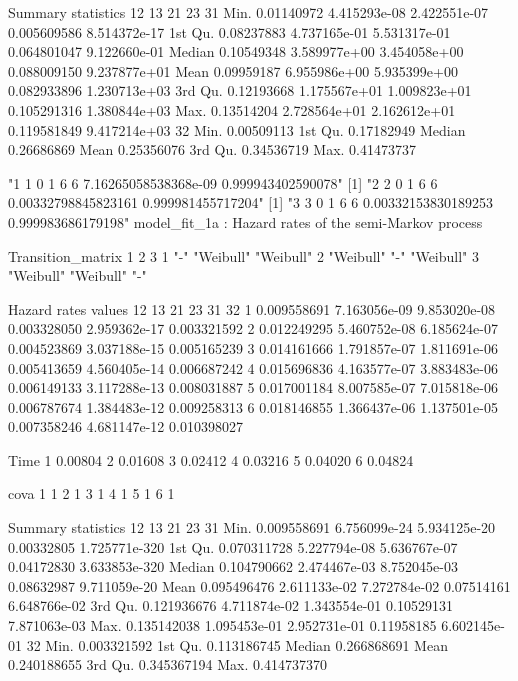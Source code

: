 \documentclass[11pt,a4paper]{article}
\begin{document}
\begin{enumerate}
\begin{Schunk}
\begin{Soutput}
Summary statistics
                12           13           21          23           31
Min.    0.01140972 4.415293e-08 2.422551e-07 0.005609586 8.514372e-17
1st Qu. 0.08237883 4.737165e-01 5.531317e-01 0.064801047 9.122660e-01
Median  0.10549348 3.589977e+00 3.454058e+00 0.088009150 9.237877e+01
Mean    0.09959187 6.955986e+00 5.935399e+00 0.082933896 1.230713e+03
3rd Qu. 0.12193668 1.175567e+01 1.009823e+01 0.105291316 1.380844e+03
Max.    0.13514204 2.728564e+01 2.162612e+01 0.119581849 9.417214e+03
                32
Min.    0.00509113
1st Qu. 0.17182949
Median  0.26686869
Mean    0.25356076
3rd Qu. 0.34536719
Max.    0.41473737
\end{Soutput}
\begin{Soutput}
[1] "1 1 0 1 6 6 7.16265058538368e-09 0.999943402590078"
[1] "2 2 0 1 6 6 0.00332798845823161 0.999981455717204"
[1] "3 3 0 1 6 6 0.00332153830189253 0.999983686179198"
model_fit_1a  : Hazard rates of the semi-Markov process

Transition_matrix
  1         2         3        
1 "-"       "Weibull" "Weibull"
2 "Weibull" "-"       "Weibull"
3 "Weibull" "Weibull" "-"      

Hazard rates values 
           12           13           21          23           31          32
1 0.009558691 7.163056e-09 9.853020e-08 0.003328050 2.959362e-17 0.003321592
2 0.012249295 5.460752e-08 6.185624e-07 0.004523869 3.037188e-15 0.005165239
3 0.014161666 1.791857e-07 1.811691e-06 0.005413659 4.560405e-14 0.006687242
4 0.015696836 4.163577e-07 3.883483e-06 0.006149133 3.117288e-13 0.008031887
5 0.017001184 8.007585e-07 7.015818e-06 0.006787674 1.384483e-12 0.009258313
6 0.018146855 1.366437e-06 1.137501e-05 0.007358246 4.681147e-12 0.010398027

     Time
1 0.00804
2 0.01608
3 0.02412
4 0.03216
5 0.04020
6 0.04824

  cova
1    1
2    1
3    1
4    1
5    1
6    1

Summary statistics
                 12           13           21         23            31
Min.    0.009558691 6.756099e-24 5.934125e-20 0.00332805 1.725771e-320
1st Qu. 0.070311728 5.227794e-08 5.636767e-07 0.04172830 3.633853e-320
Median  0.104790662 2.474467e-03 8.752045e-03 0.08632987  9.711059e-20
Mean    0.095496476 2.611133e-02 7.272784e-02 0.07514161  6.648766e-02
3rd Qu. 0.121936676 4.711874e-02 1.343554e-01 0.10529131  7.871063e-03
Max.    0.135142038 1.095453e-01 2.952731e-01 0.11958185  6.602145e-01
                 32
Min.    0.003321592
1st Qu. 0.113186745
Median  0.266868691
Mean    0.240188655
3rd Qu. 0.345367194
Max.    0.414737370
\end{Soutput}
\end{Schunk}


\end{enumerate}
\end{document}
